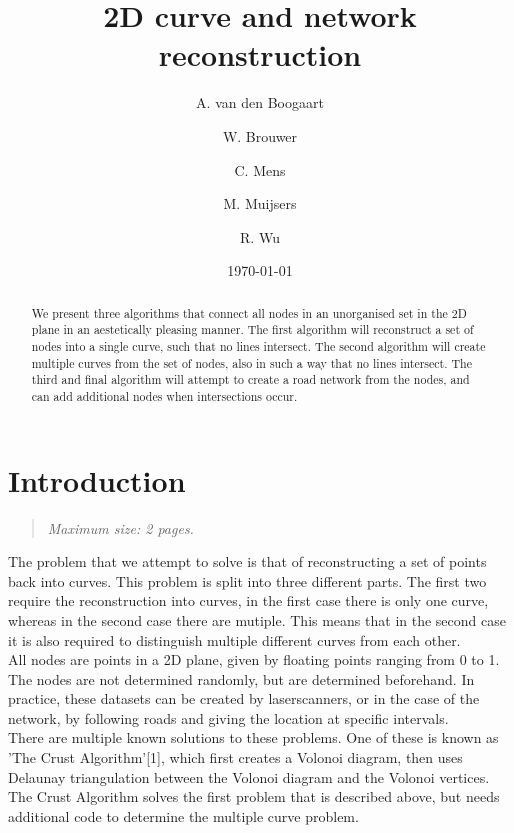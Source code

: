 \documentclass[11pt]{article}
\title{2D curve and network reconstruction}
\author{
A. van den Boogaart \and
W. Brouwer \and
C. Mens \and
M. Muijsers \and
R. Wu
}
\date{\today}
\newcommand{\maxsize}[1]{\begin{quotation} {\sl \noindent Maximum size: #1.} \end{quotation}}
\begin{document}
\newpage

\maketitle

\begin{abstract}
We present three algorithms that connect all nodes in an unorganised set in the 2D plane in an aestetically pleasing manner. 
The first algorithm will reconstruct a set of nodes into a single curve, such that no lines intersect. 
The second algorithm will create multiple curves from the set of nodes, also in such a way that no lines intersect. 
The third and final algorithm will attempt to create a road network from the nodes, and can add additional nodes when intersections occur.\\

\end{abstract}



\section{Introduction}
\label{se:introduction}
\maxsize{2 pages}
The problem that we attempt to solve is that of reconstructing a set of points back into curves. 
This problem is split into three different parts. The first two require the reconstruction into curves, in the first case there is only one curve, whereas in the second case there are mutiple. 
This means that in the second case it is also required to distinguish multiple different curves from each other.\\
All nodes are points in a 2D plane, given by floating points ranging from 0 to 1. 
The nodes are not determined randomly, but are determined beforehand. In practice, these datasets can be created by laserscanners, or in the case of the network, by following roads and giving the location at specific intervals.\\
There are multiple known solutions to these problems. One of these is known as 'The Crust Algorithm'[1], which first creates a Volonoi diagram, then uses Delaunay triangulation between the Volonoi diagram and the Volonoi vertices.\\
The Crust Algorithm solves the first problem that is described above, but needs additional code to determine the multiple curve problem.\\
\end{document}
